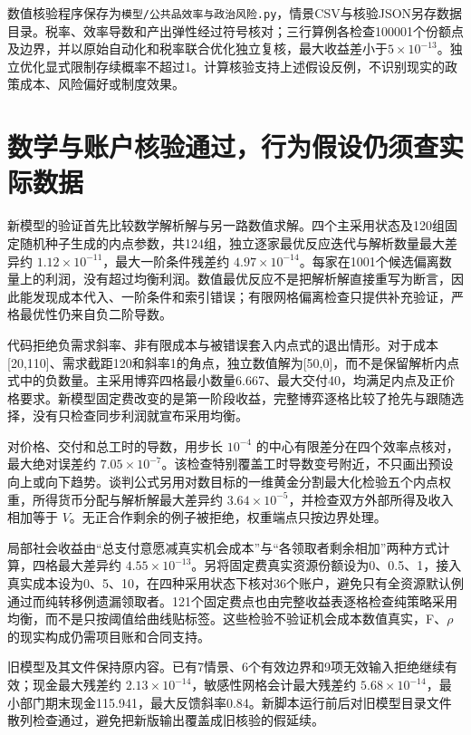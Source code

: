 \documentclass[UTF8,fontset=windows,12pt,a4paper,oneside,openany]{ctexbook}
\begin{document}
数值核验程序保存为\texttt{模型/公共品效率与政治风险.py}，情景CSV与核验JSON另存数据目录。税率、效率导数和产出弹性经过符号核对；三行算例各检查100001个份额点及边界，并以原始自动化和税率联合优化独立复核，最大收益差小于$5\times10^{-13}$。独立优化显式限制存续概率不超过1。计算核验支持上述假设反例，不识别现实的政策成本、风险偏好或制度效果。

\section{数学与账户核验通过，行为假设仍须查实际数据}

新模型的验证首先比较数学解析解与另一路数值求解。四个主采用状态及120组固定随机种子生成的内点参数，共124组，独立逐家最优反应迭代与解析数量最大差异约 \(1.12\times10^{-11}\)，最大一阶条件残差约 \(4.97\times10^{-14}\)。每家在1001个候选偏离数量上的利润，没有超过均衡利润。数值最优反应不是把解析解直接重写为断言，因此能发现成本代入、一阶条件和索引错误；有限网格偏离检查只提供补充验证，严格最优性仍来自负二阶导数。

代码拒绝负需求斜率、非有限成本与被错误套入内点式的退出情形。对于成本[20,110]、需求截距120和斜率1的角点，独立数值解为[50,0]，而不是保留解析内点式中的负数量。主采用博弈四格最小数量6.667、最大交付40，均满足内点及正价格要求。新模型固定费改变的是第一阶段收益，完整博弈逐格比较了抢先与跟随选择，没有只检查同步利润就宣布采用均衡。

对价格、交付和总工时的导数，用步长 \(10^{-4}\) 的中心有限差分在四个效率点核对，最大绝对误差约 \(7.05\times10^{-7}\)。该检查特别覆盖工时导数变号附近，不只画出预设向上或向下趋势。谈判公式另用对数目标的一维黄金分割最大化检验五个内点权重，所得货币分配与解析解最大差异约 \(3.64\times10^{-5}\)，并检查双方外部所得及收入相加等于 \(V\)。无正合作剩余的例子被拒绝，权重端点只按边界处理。

局部社会收益由“总支付意愿减真实机会成本”与“各领取者剩余相加”两种方式计算，四格最大差异约 \(4.55\times10^{-13}\)。另将固定费真实资源份额设为0、0.5、1，接入真实成本设为0、5、10，在四种采用状态下核对36个账户，避免只有全资源默认例通过而纯转移例遗漏领取者。121个固定费点也由完整收益表逐格检查纯策略采用均衡，而不是只按阈值给曲线贴标签。这些检验不验证机会成本数值真实，F、\ensuremath{\rho}的现实构成仍需项目账和合同支持。

旧模型及其文件保持原内容。已有7情景、6个有效边界和9项无效输入拒绝继续有效；现金最大残差约 \(2.13\times10^{-14}\)，敏感性网格会计最大残差约 \(5.68\times10^{-14}\)，最小部门期末现金115.941，最大反馈斜率0.84。新脚本运行前后对旧模型目录文件散列检查通过，避免把新版输出覆盖成旧核验的假延续。
\end{document}

